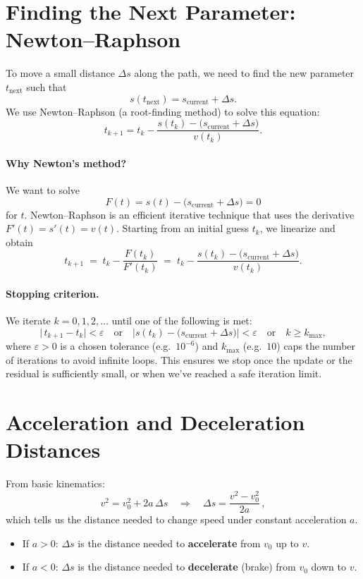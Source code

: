 \documentclass[11pt]{article}
\begin{document}
\section{Finding the Next Parameter: Newton–Raphson}

To move a small distance \(\Delta s\) along the path, we need to find the new parameter \(t_{\text{next}}\) such that 
\[
s(t_{\text{next}}) = s_{\text{current}} + \Delta s.
\]
We use Newton–Raphson (a root-finding method) to solve this equation:
\[
t_{k+1} = t_k - \frac{s(t_k) - \bigl(s_{\text{current}}+\Delta s\bigr)}{v(t_k)}.
\]

\paragraph{Why Newton's method?} We want to solve 
\[
F(t) = s(t) - \bigl(s_{\text{current}}+\Delta s\bigr) = 0
\]
for \(t\). Newton–Raphson is an efficient iterative technique that uses the derivative \(F'(t)=s'(t)=v(t)\).  Starting from an initial guess \(t_k\), we linearize and obtain
\[
t_{k+1} \;=\; t_k - \frac{F(t_k)}{F'(t_k)}
\;=\; t_k - \frac{s(t_k) - \bigl(s_{\text{current}}+\Delta s\bigr)}{v(t_k)}.
\]

\paragraph{Stopping criterion.} We iterate \(k=0,1,2,\dots\) until one of the following is met:
\[
\bigl|\,t_{k+1}-t_k\bigr| < \varepsilon
\quad\text{or}\quad
\bigl|s(t_k) - \bigl(s_{\text{current}}+\Delta s\bigr)\bigr| < \varepsilon
\quad\text{or}\quad
k \ge k_{\max},
\]
where \(\varepsilon>0\) is a chosen tolerance (e.g.\ \(10^{-6}\)) and \(k_{\max}\) (e.g.\ \(10\)) caps the number of iterations to avoid infinite loops. This ensures we stop once the update or the residual is sufficiently small, or when we’ve reached a safe iteration limit.
\section{Acceleration and Deceleration Distances}

From basic kinematics:
\[
v^2 = v_0^2 + 2a\,\Delta s
\quad\Longrightarrow\quad
\Delta s = \frac{v^2 - v_0^2}{2a}\,,
\] 
which tells us the distance needed to change speed under constant acceleration $a$. 

\begin{itemize}
  \item If \(a > 0\): \(\Delta s\) is the distance needed to \textbf{accelerate} from \(v_0\) up to \(v\).
  \item If \(a < 0\): \(\Delta s\) is the distance needed to \textbf{decelerate} (brake) from \(v_0\) down to \(v\).
\end{itemize}
\end{document}
